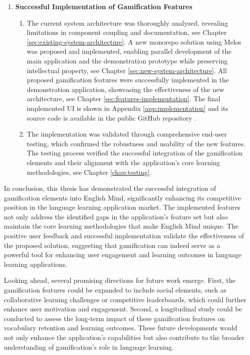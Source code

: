 \begin{enumerate}
    \newpage
    \item \textbf{Successful Implementation of Gamification Features}
    \begin{enumerate}
        \item The current system architecture was thoroughly analyzed, revealing limitations in component coupling and documentation, see Chapter \ref{sec:existing-system-architecture}. A new monorepo solution using Melos was proposed and implemented, enabling parallel development of the main application and the demonstration prototype while preserving intellectual property, see Chapter \ref{sec:new-system-architecture}. All proposed gamification features were successfully implemented in the demonstration application, showcasing the effectiveness of the new architecture, see Chapter \ref{sec:features-implementation}. The final implemented UI is shown in Appendix \ref{app:implementation} and its source code is available in the public GitHub repository \cite{cite:source_code_repository}.

        \item The implementation was validated through comprehensive end-user testing, which confirmed the robustness and usability of the new features. The testing process verified the successful integration of the gamification elements and their alignment with the application's core learning methodologies, see Chapter \ref{chap:testing}.
    \end{enumerate}
\end{enumerate}

In conclusion, this thesis has demonstrated the successful integration of gamification elements into English Mind, significantly enhancing its competitive position in the language learning application market. The implemented features not only address the identified gaps in the application's feature set but also maintain the core learning methodologies that make English Mind unique. The positive user feedback and successful implementation validate the effectiveness of the proposed solution, suggesting that gamification can indeed serve as a powerful tool for enhancing user engagement and learning outcomes in language learning applications.

Looking ahead, several promising directions for future work emerge. First, the gamification features could be expanded to include social elements, such as collaborative learning challenges or competitive leaderboards, which could further enhance user motivation and engagement. Second, a longitudinal study could be conducted to assess the long-term impact of these gamification features on vocabulary retention and learning outcomes. These future developments would not only enhance the application's capabilities but also contribute to the broader understanding of gamification's role in language learning.
